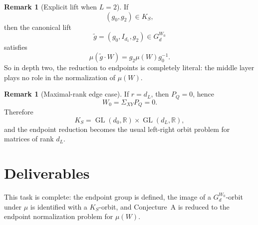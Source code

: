\documentclass{article}
\newcommand{\GL}{\operatorname{GL}}
\newcommand{\R}{\mathbb{R}}
\theoremstyle{definition}
\newtheorem{remark}[theorem]{Remark}
\begin{document}
\begin{remark}[Explicit lift when $L=2$]
If
\[
(g_0,g_2)\in K_S,
\]
then the canonical lift
\[
\widetilde g=(g_0,I_{d_1},g_2)\in G_d^{W_0}
\]
satisfies
\[
\mu(\widetilde g\cdot W)=g_2\mu(W)g_0^{-1}.
\]
So in depth two, the reduction to endpoints is completely literal: the middle layer plays no role in the normalization of $\mu(W)$.
\end{remark}

\begin{remark}[Maximal-rank edge case]
If $r=d_L$, then $P_Q=0$, hence
\[
W_0=\Sigma_{XY}P_Q=0.
\]
Therefore
\[
K_S=\GL(d_0,\R)\times \GL(d_L,\R),
\]
and the endpoint reduction becomes the usual left-right orbit problem for matrices of rank $d_L$.
\end{remark}

\section{Deliverables}

This task is complete: the endpoint group is defined, the image of a $G_d^{W_0}$-orbit under $\mu$ is identified with a $K_S$-orbit, and Conjecture~A is reduced to the endpoint normalization problem for $\mu(W)$.
\end{document}
